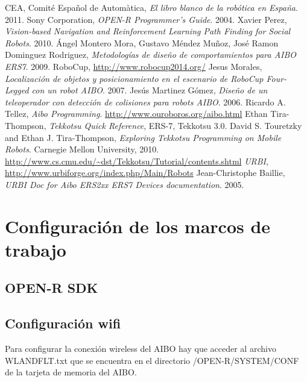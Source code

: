 \documentclass[12pt,a4paper,final,twoside]{article}
\begin{document}
\newpage
\clearpage
{}
\begin{thebibliography}{99}

	CEA, Comité Español de Automàtica,
	\emph{El libro blanco de la robótica en España}.
	2011.
  Sony Corporation,
  \emph{OPEN-R Programmer's Guide}.
  2004.
	Xavier Perez,
	\emph{Vision-based Navigation and Reinforcement Learning Path Finding for Social Robots}.
	2010.
	Ángel Montero Mora, Gustavo Méndez Muñoz, José Ramon Dominguez Rodriguez,
	\emph{Metodologías de diseño de comportamientos para AIBO ERS7}.
	2009.
	RoboCup, \url{http://www.robocup2014.org/}
	Jesus Morales,
	\emph{Localización de objetos y posicionamiento en el escenario de RoboCup Four-Legged con un robot AIBO}.
	2007.  
	Jesús Martinez Gómez, 
	\emph{Diseño de un teleoperador con detección de colisiones para robots AIBO}. 			2006.
	Ricardo A. Tellez,
	\emph{Aibo Programming}.
	\url{http://www.ouroboros.org/aibo.html}
	Ethan Tira-Thompson,
	\emph{Tekkotsu Quick Reference}, ERS-7, Tekkotsu 3.0.
	David S. Touretzky and Ethan J. Tira-Thompson, 
	\emph{Exploring Tekkotsu Programming on Mobile Robots}.
	Carnegie Mellon University,
	2010.
	\url{http://www.cs.cmu.edu/~dst/Tekkotsu/Tutorial/contents.shtml}
	\emph{URBI},
	\url{http://www.urbiforge.org/index.php/Main/Robots}
	Jean-Christophe Baillie,
	\emph{URBI Doc for Aibo ERS2xx ERS7 Devices documentation}.
	2005.
	
\end{thebibliography}

\label{Referencies}
%

\appendix
\clearpage %
\addappheadtotoc
\appendixpage
\section{Configuración de los marcos de trabajo }\label{marcos}
\subsection{OPEN-R SDK}
\subsection{Configuración wifi}
Para configurar la conexión wireless del AIBO hay que acceder al archivo WLANDFLT.txt que se encuentra en el directorio /OPEN-R/SYSTEM/CONF de la tarjeta de memoria del AIBO.
\end{document}
